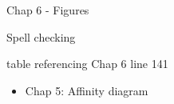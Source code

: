 \documentclass{report}
\begin{document}
\begin{itemise}   
\item  Chap 6 - Figures
\item  Spell checking
\item \item table referencing Chap 6 line 141

\end{itemise}


\begin{itemize}
  \item Chap 5: Affinity diagram
\end{itemize}
\end{document}
